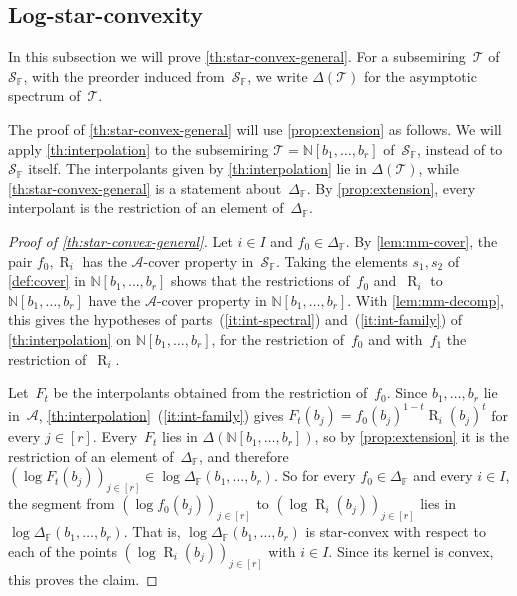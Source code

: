 \documentclass[11pt,letterpaper]{article}
\DeclareMathOperator{\tensorrank}{R}
\newcommand{\FF}{\mathbb{F}}
\newcommand{\NN}{\mathbb{N}}
\begin{document}
\subsection{Log-star-convexity}\label{sec:mm-proof}

In this subsection we will prove \cref{th:star-convex-general}. For a subsemiring~$\mathcal{T}$ of~$\mathcal{S}_\FF$, with the preorder induced from~$\mathcal{S}_\FF$, we write $\Delta(\mathcal{T})$ for the asymptotic spectrum of~$\mathcal{T}$.

The proof of \cref{th:star-convex-general} will use \cref{prop:extension} as follows. We will apply \cref{th:interpolation} to the subsemiring $\mathcal{T} = \NN[b_1, \ldots, b_r]$ of~$\mathcal{S}_\FF$, instead of to~$\mathcal{S}_\FF$ itself. The interpolants given by \cref{th:interpolation} lie in $\Delta(\mathcal{T})$, while \cref{th:star-convex-general} is a statement about~$\Delta_\FF$. By \cref{prop:extension}, every interpolant is the restriction of an element of~$\Delta_\FF$.

\begin{proof}[Proof of \cref{th:star-convex-general}]
Let $i \in I$ and $f_0 \in \Delta_\FF$. By \cref{lem:mm-cover}, the pair $f_0, \tensorrank_i$ has the $\mathcal{A}$-cover property in~$\mathcal{S}_\FF$. Taking the elements $s_1, s_2$ of \cref{def:cover} in $\NN[b_1, \ldots, b_r]$ shows that the restrictions of~$f_0$ and~$\tensorrank_i$ to $\NN[b_1, \ldots, b_r]$ have the $\mathcal{A}$-cover property in $\NN[b_1, \ldots, b_r]$. With \cref{lem:mm-decomp}, this gives the hypotheses of parts~(\ref{it:int-spectral}) and~(\ref{it:int-family}) of \cref{th:interpolation} on $\NN[b_1, \ldots, b_r]$, for the restriction of~$f_0$ and with~$f_1$ the restriction of~$\tensorrank_i$.

Let~$F_t$ be the interpolants obtained from the restriction of~$f_0$. Since $b_1, \ldots, b_r$ lie in~$\mathcal{A}$, \cref{th:interpolation}~(\ref{it:int-family}) gives $F_t(b_j) = f_0(b_j)^{1-t} \tensorrank_i(b_j)^t$ for every $j \in [r]$. Every~$F_t$ lies in $\Delta(\NN[b_1, \ldots, b_r])$, so by \cref{prop:extension} it is the restriction of an element of~$\Delta_\FF$, and therefore $(\log F_t(b_j))_{j \in [r]} \in \log \Delta_\FF(b_1, \ldots, b_r)$. So for every $f_0 \in \Delta_\FF$ and every $i \in I$, the segment from $(\log f_0(b_j))_{j \in [r]}$ to $(\log \tensorrank_i(b_j))_{j \in [r]}$ lies in $\log \Delta_\FF(b_1, \ldots, b_r)$. That is, $\log \Delta_\FF(b_1, \ldots, b_r)$ is star-convex with respect to each of the points $(\log \tensorrank_i(b_j))_{j \in [r]}$ with $i \in I$. Since its kernel is convex, this proves the claim.
\end{proof}
\end{document}
